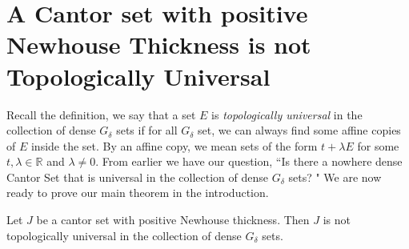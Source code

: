 \section{A Cantor set with positive Newhouse Thickness is not Topologically Universal}

Recall the definition, we  say that a set $E$ is  {\it topologically universal} in the collection of dense $G_{\delta}$ sets if for all $G_{\delta}$ set,  we can  always find some affine copies of $E$ inside the set. By an affine copy, we  mean sets of  the form $t+\lambda E$ for some $t, \lambda \in{\mathbb R}$ and $\lambda\ne 0$. From earlier we have our question,   ``Is there a nowhere dense Cantor Set that is universal in the collection of dense $G_\delta$ sets? "  We are now ready to prove our main theorem in the introduction. 

\begin{theorem}\label{theorem_positive_NW}
Let $J$ be a cantor set with positive Newhouse thickness.  Then $J$ is not topologically universal in the collection of dense $G_\delta$ sets.
\end{theorem}

